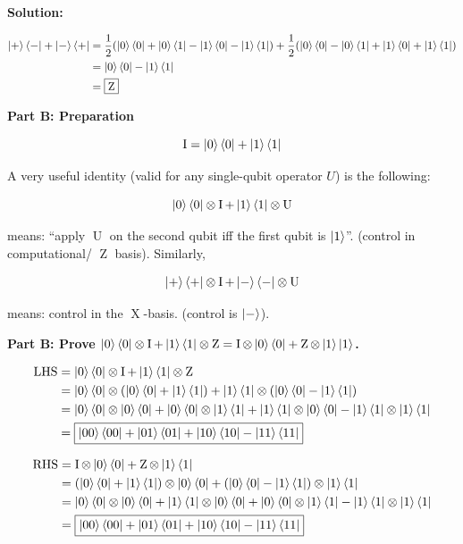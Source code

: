\documentclass[11pt]{article}
\newenvironment{solution}
{\par\noindent\textbf{Solution:}\par}
{\vspace{1em}}
\begin{document}
\begin{solution}
\[\begin{aligned}
\ket{+}\bra{-} + \ket{-}\bra{+} &= \frac{1}{2}(\ket{0}\bra{0} + \ket{0}\bra{1} - \ket{1}\bra{0} - \ket{1}\bra{1}) + \frac{1}{2}(\ket{0}\bra{0} - \ket{0}\bra{1} + \ket{1}\bra{0} + \ket{1}\bra{1}) \\
&= \ket{0}\bra{0} - \ket{1}\bra{1} \\
&= \boxed{\operatorname{Z}}
\end{aligned}\]

\textbf{Part B: Preparation}

\[\operatorname{I} = \ket{0}\bra{0} + \ket{1}\bra{1}\]

A very useful identity (valid for any single-qubit operator $U$) is the following:

\[\ket{0}\bra{0} \otimes \operatorname{I} + \ket{1}\bra{1} \otimes \operatorname{U}\]

means: “apply $\operatorname{U}$ on the second qubit iff the first qubit is $\ket{1}$”. (control in computational/
$\operatorname{Z}$ basis). Similarly,

\[\ket{+}\bra{+} \otimes \operatorname{I} + \ket{-}\bra{-} \otimes \operatorname{U}\]

means: control in the $\operatorname{X}$-basis. (control is $\ket{-}$).

\textbf{Part B: Prove $\ket{0}\bra{0} \otimes \operatorname{I} + \ket{1}\bra{1} \otimes \operatorname{Z} = \operatorname{I} \otimes \ket{0}\bra{0} + \operatorname{Z} \otimes \ket{1}\ket{1}$.}

\[\begin{aligned}
\text{LHS} &= \ket{0}\bra{0} \otimes \operatorname{I} + \ket{1}\bra{1} \otimes \operatorname{Z} \\
&= \ket{0}\bra{0} \otimes (\ket{0}\bra{0} + \ket{1}\bra{1})+ \ket{1}\bra{1} \otimes (\ket{0}\bra{0} - \ket{1}\bra{1}) \\
&= \ket{0}\bra{0} \otimes \ket{0}\bra{0} + \ket{0}\bra{0} \otimes \ket{1}\bra{1} + \ket{1}\bra{1} \otimes \ket{0}\bra{0} - \ket{1}\bra{1} \otimes \ket{1}\bra{1} \\
&= \boxed{\ket{00}\bra{00} + \ket{01}\bra{01} + \ket{10}\bra{10} - \ket{11}\bra{11}}
\end{aligned}\]

\[\begin{aligned}
\text{RHS} &= \operatorname{I} \otimes \ket{0}\bra{0} + \operatorname{Z} \otimes \ket{1}\bra{1} \\
&= (\ket{0}\bra{0} + \ket{1}\bra{1}) \otimes \ket{0}\bra{0} + (\ket{0}\bra{0} - \ket{1}\bra{1}) \otimes \ket{1}\bra{1} \\
&= \ket{0}\bra{0} \otimes \ket{0}\bra{0} + \ket{1}\bra{1} \otimes \ket{0}\bra{0} + \ket{0}\bra{0} \otimes \ket{1}\bra{1} - \ket{1}\bra{1} \otimes \ket{1}\bra{1} \\
&= \boxed{\ket{00}\bra{00} + \ket{01}\bra{01} + \ket{10}\bra{10} - \ket{11}\bra{11}}
\end{aligned}\]


\end{solution}
\end{document}
